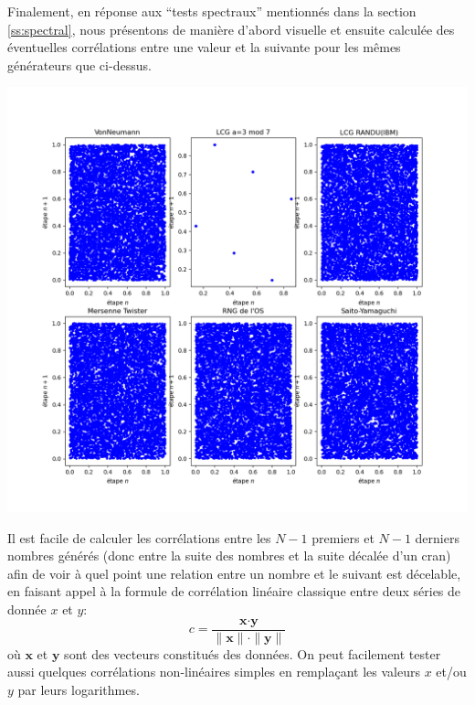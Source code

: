 \documentclass{scrartcl}
\begin{document}
Finalement, en réponse aux ``tests spectraux'' mentionnés dans la section
\ref{ss:spectral}, nous présentons de manière d'abord visuelle et ensuite
calculée des éventuelles corrélations entre une valeur et la suivante pour les
mêmes générateurs que ci-dessus.
\begin{center}
  \includegraphics[width=\textwidth]{img/correlations8000.png}
\end{center}

Il est facile de calculer les corrélations entre les $N-1$ premiers et $N-1$
derniers nombres générés (donc entre la suite des nombres et la suite décalée
d'un cran) afin de voir à quel point une relation entre un nombre et le suivant
est décelable, en faisant appel à la formule de corrélation linéaire classique
entre deux séries de donnée $x$ et $y$:
\[ c = \frac{\bm x\boldsymbol\cdot \bm y}{\|\bm x\|\cdot\|\bm y\|} \]
où $\bm x$ et $\bm y$ sont des vecteurs constitués des données.
On peut facilement tester aussi quelques corrélations non-linéaires simples en
remplaçant les valeurs $x$ et/ou $y$ par leurs logarithmes.
\end{document}
